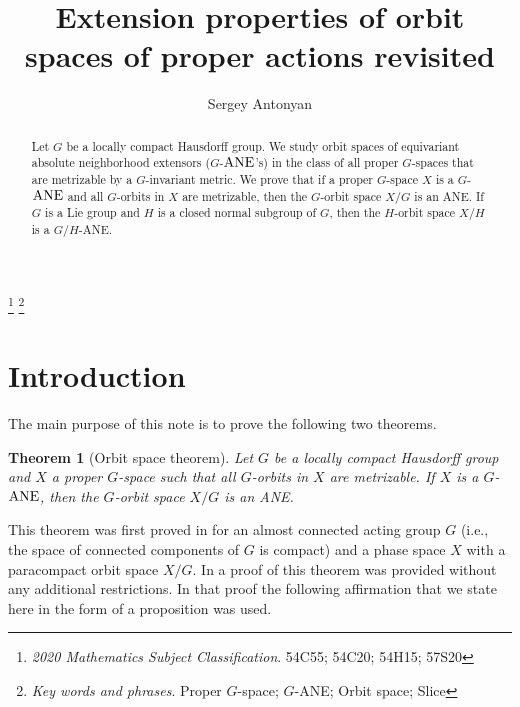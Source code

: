 \documentclass{amsart}
\newtheorem{theorem}{Theorem}[section]
\begin{document}
\title{Extension properties of orbit spaces of proper  actions  revisited}

\author{Sergey Antonyan\\[3pt]}

\address{Departamento de  Matem\'aticas,
Facultad de Ciencias, Universidad Nacional Aut\'onoma de M\'exico,
 04510 M\'exico City, M\'exico.}


\begin{abstract} Let  $G$ be a locally compact Hausdorff group. We   study orbit spaces   of equivariant absolute neighborhood extensors ($G$-${\rm ANE}$'s) in the class
 of all proper $G$-spaces  that are metrizable by a $G$-invariant metric. 
 We  prove that if a proper $G$-space $X$ is a  $G$-${\rm ANE}$ and all  $G $-orbits in $X$ are metrizable, then  the $G$-orbit space  $X/G$ is an {\rm ANE}. If $G$ is a Lie group and 
 $H$  is a closed  normal subgroup of $G$, then  the $H$-orbit space  $X/H$ is a $G/H$-{\rm ANE}. 
\end{abstract}

\thanks {{\it 2020 Mathematics Subject Classification}.  54C55; 54C20; 54H15; 57S20}
\thanks{{\it  Key words and phrases}. Proper $G$-space; $G$-{\rm ANE};  Orbit space; Slice} 



\maketitle
{}

\section {Introduction}

The  main  purpose  of this note is to prove the following two theorems.

\begin{theorem}[Orbit space theorem]\label{T:0}
Let $G$ be a locally compact Hausdorff group and $X$   a proper $G$-space such that  all  $G$-orbits in $X$ are metrizable. 
 If  $X$ is a $G$-${\rm ANE}$, then the $G$-orbit space  $X/G$ is an {\rm ANE}. 

\end{theorem}


\smallskip

This theorem was first  proved in  \cite[Theorems 3.11]{ant:99} for   an almost connected acting group $G$ (i.e., the space of connected components  of $G$ is compact) and a phase space $X$ with  a paracompact orbit space $X/G$.  In \cite[Theorem 6.4]{ant:jap}      a proof  of this theorem was provided without any additional restrictions. In that proof         
      the following affirmation that we state here in the form of a proposition was used.        
        
\end{document}
